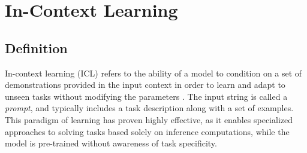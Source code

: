 \chapter{In-Context Learning}\label{chap:in-context-learning}




\section{Definition}

In-context learning (ICL) refers to the ability of a model to condition on a set of demonstrations provided in the input context in order to learn and adapt to unseen tasks without modifying the parameters \parencite{brown2020}. The input string is called a \textit{prompt}, and typically includes a task description along with a set of examples. This paradigm of learning has proven highly effective, as it enables specialized approaches to solving tasks based solely on inference computations, while the model is pre-trained without awareness of task specificity.

